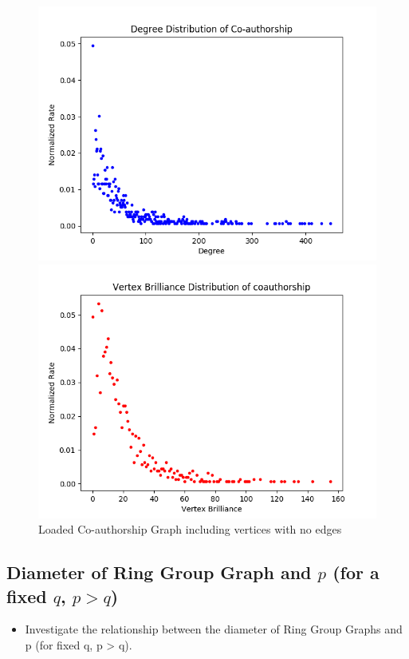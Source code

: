 \documentclass[11pt,a4paper,notitlepage]{article}
\begin{document}
\begin{figure}[H]
    \centering
    \begin{minipage}{0.49\textwidth}
        \centering
        \includegraphics[width=1\textwidth]{coauthorship-vertex-degree.png}
    \end{minipage}
    \begin{minipage}{0.49\textwidth}
        \centering
        \includegraphics[width=1\textwidth]{coauthorship-vertex-brilliance.png}
    \end{minipage} \hfill
    \caption{Loaded Co-authorship Graph including vertices with no edges}
\end{figure}
 
\subsection*{Diameter of Ring Group Graph and $p$ (for a fixed $q$, $p > q$)}
\begin{itemize}
    \item Investigate the relationship between the diameter of Ring Group Graphs and p (for fixed q, p > q). 
\end{itemize}
\end{document}
